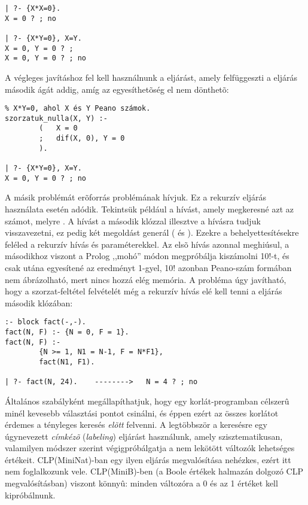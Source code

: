 \begin{verbatim}
| ?- {X*X=0}.
X = 0 ? ; no

| ?- {X*Y=0}, X=Y.
X = 0, Y = 0 ? ;
X = 0, Y = 0 ? ; no
\end{verbatim}

A végleges javításhoz fel kell használnunk a  eljárást, amely
felfüggeszti a  eljárás második ágát addig, amíg
az egyesíthetõség el nem dönthetõ:

\begin{verbatim}
% X*Y=0, ahol X és Y Peano számok.
szorzatuk_nulla(X, Y) :-
        (   X = 0 
        ;   dif(X, 0), Y = 0
        ).

| ?- {X*Y=0}, X=Y.
X = 0, Y = 0 ? ; no
\end{verbatim}

A másik problémát erõforrás problémának hívjuk. Ez a rekurzív 
eljárás használata esetén adódik. Tekintsük például a  hívást,
amely megkeresné azt az  számot, melyre . A hívást a második
 klózzal illesztve a  hívásra tudjuk visszavezetni, ez
pedig két megoldást generál ( és ). Ezekre
a behelyettesítésekre feléled a rekurzív  hívás  és
 paraméterekkel. Az elsõ hívás azonnal meghiúsul, a másodikhoz
viszont a Prolog ,,mohó'' módon megpróbálja kiszámolni 10!-t, és csak utána
egyesítené az eredményt 1-gyel, 10! azonban Peano-szám formában nem
ábrázolható, mert nincs hozzá elég memória. A probléma úgy javítható, hogy
a szorzat-feltétel felvételét még a rekurzív hívás elé kell tenni a 
eljárás második klózában:

\begin{verbatim}
:- block fact(-,-).
fact(N, F) :- {N = 0, F = 1}.
fact(N, F) :-
        {N >= 1, N1 = N-1, F = N*F1},
        fact(N1, F1).

| ?- fact(N, 24).    -------->   N = 4 ? ; no
\end{verbatim}

Általános szabályként megállapíthatjuk, hogy egy korlát-programban célszerû
minél kevesebb választási pontot csinálni, és éppen ezért az összes korlátot
érdemes a tényleges keresés \emph{elõtt} felvenni. A legtöbbször a keresésre
egy úgynevezett \emph{címkézõ} (\emph{labeling}) eljárást használunk, amely
szisztematikusan, valamilyen módszer szerint végigpróbálgatja a nem lekötött
változók lehetséges értékeit. CLP(MiniNat)-ban egy ilyen eljárás megvalósítása
nehézkes, ezért itt nem foglalkozunk vele. CLP(MiniB)-ben (a Boole értékek
halmazán dolgozó CLP megvalósításban) viszont könnyû: minden változóra a
0 és az 1 értéket kell kipróbálnunk.
